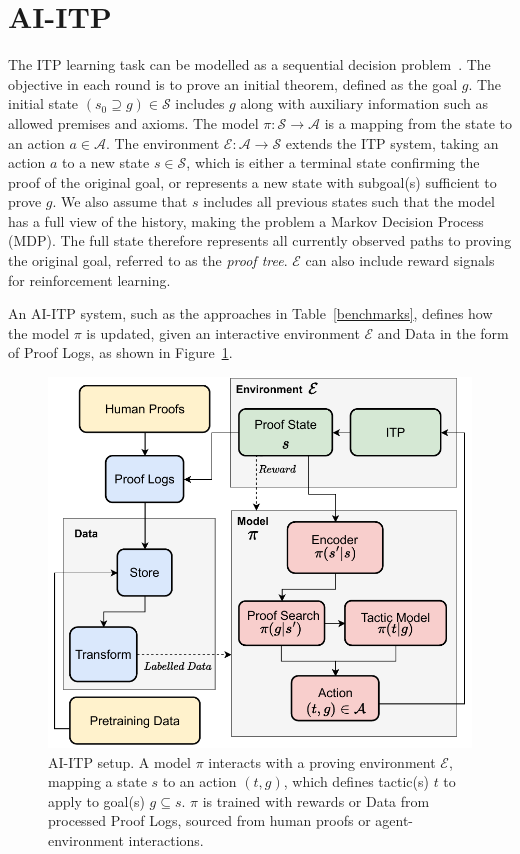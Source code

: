 \documentclass[letterpaper]{article} %
\begin{document}
    \section{AI-ITP}
    The ITP learning task can be modelled as a sequential decision problem~\cite{powell_reinforcement_2022, wu_tacticzero_2021}.
    The objective in each round is to prove an initial theorem, defined as the goal $g$.
    The initial state $(s_0 \supseteq g) \in \mathcal{S}$ includes $g$ along with auxiliary information such as allowed premises and axioms.
    The model $\pi: \mathcal{S} \to \mathcal{A}$ is a mapping from the state to an action $a \in \mathcal{A}$.
    The environment $\mathcal{E}: \mathcal{A} \to \mathcal{S}$ extends the ITP system,
    taking an action $a$ to a new state $s \in \mathcal{S}$, which
    is either a terminal state confirming the proof of the original goal,
    or represents a new state with subgoal(s) sufficient to prove $g$.
    We also assume that $s$ includes all previous states such that the model has a full view of the history, making the problem a Markov Decision Process (MDP). The full state therefore represents all currently observed paths to proving the original goal, referred to as the \textit{proof tree}.
    $\mathcal{E}$ can also include reward signals for reinforcement learning.

    An AI-ITP system, such as the approaches in Table~\ref{benchmarks}, defines how the model $\pi$ is updated, given an interactive environment $\mathcal{E}$ and Data in the form of Proof Logs, as shown in Figure~\ref{fig:ai-itp}.

    \begin{figure}[h]
        \centering
        \includegraphics[width=\linewidth]{aitp.pdf}
        \caption{AI-ITP setup. A model $\pi$ interacts with a proving environment $\mathcal{E}$, mapping a state $s$ to an action $(t,g)$, which defines tactic(s) $t$ to apply to goal(s) $g \subseteq s$. $\pi$ is trained with rewards or Data from processed Proof Logs, sourced from human proofs or agent-environment interactions.}
        \label{fig:ai-itp}
    \end{figure}
\end{document}
